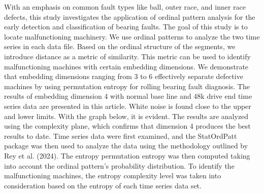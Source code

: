 \documentclass[a0,portrait]{a0poster}
\begin{document}
\begin{mdframed}[style=MyFrame]
\begin{multicols}{2}
With an emphasis on common fault types like ball, outer race, and inner race defects, this study investigates the application of ordinal pattern analysis for the early detection and classification of bearing faults. The goal of this study is to locate malfunctioning machinery. We use ordinal patterns to analyze the two time series in each data file. Based on the ordinal structure of the segments, we introduce distance as a metric of similarity. This metric can be used to identify malfunctioning machines with certain embedding dimensions. We demonstrate that embedding dimensions ranging from 3 to 6 effectively separate defective machines by using permutation entropy for rolling bearing fault diagnosis. The results of embedding dimension 4 with normal base line and 48k drive end time series data are presented in this article. White noise is found close to the upper and lower limits. With the graph below, it is evident. The results are analyzed using the complexity plane, which confirms that dimension 4 produces the best results to date. Time series data were first examined, and the StatOrdPatt package was then used to analyze the data using the methodology outlined by Rey et al. (2024). The entropy permutation entropy was then computed taking into account the ordinal pattern's probability distribution. To identify the malfunctioning machines, the entropy complexity level was taken into consideration based on the entropy of each time series data set.


\end{multicols}
\end{mdframed}
\end{document}
